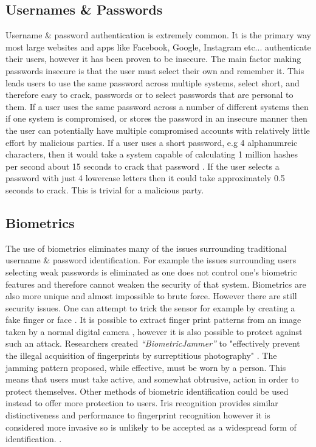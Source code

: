 \documentclass[12pt]{article}
\begin{document}
	\subsection{Usernames \& Passwords}
	Username \& password authentication is extremely common. It is the primary way most large websites and apps like Facebook, Google, Instagram etc... authenticate their users, however it has been proven to be insecure. The main factor making passwords insecure is that the user must select their own and remember it. This leads users to use the same password across multiple systems, select short, and therefore easy to crack, passwords or to select passwords that are personal to them.
	If a user uses the same password across a number of different systems then if one system is compromised, or stores the password in an insecure manner then the user can potentially have multiple compromised accounts with relatively little effort by malicious parties.
	If a user uses a short password, e.g 4 alphanumreic characters, then it would take a system capable of calculating 1 million hashes per second about 15 seconds to crack that password \citep{kessler1996passwords}. If the user selects a password with just 4 lowercase letters then it could take approximately 0.5 seconds to crack. This is trivial for a malicious party.
	\subsection{Biometrics}
	\label{subsect_biometrics}
	The use of biometrics eliminates many of the issues surrounding traditional username \& password identification. For example the issues surrounding users selecting weak passwords is eliminated as one does not control one's biometric features and therefore cannot weaken the security of that system. Biometrics are also more unique and almost impossible to brute force.
	However there are still security issues. One can attempt to trick the sensor for example by creating a fake finger or face \citep{ambalakat2005security}. It is possible to extract finger print patterns from an image taken by a normal digital camera \citep{ogane2017biometric}, however it is also possible to protect against such an attack. Researchers created \emph{``BiometricJammer''} to "effectively prevent the illegal acquisition of fingerprints by surreptitious photography" \citep{ogane2017biometric}. The jamming pattern proposed, while effective, must be worn by a person. This means that users must take active, and somewhat obtrusive, action in order to protect themselves. Other methods of biometric identification could be used instead to offer more protection to users.
	Iris recognition provides similar distinctiveness and performance to fingerprint recognition however it is considered more invasive so is unlikely to be accepted as a widespread form of identification. \citep{ambalakat2005security}.
\end{document}
